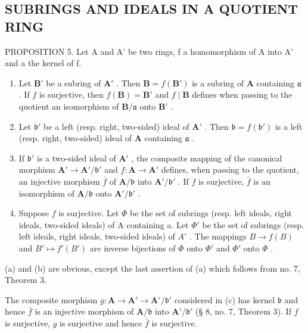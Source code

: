 \subsection{SUBRINGS AND IDEALS IN A QUOTIENT RING}

PROPOSITION 5. Let A and A' be two rings, f a homomorphism of A into A' and a the kernel of f.

\begin{enumerate}
\def\labelenumi{(\alph{enumi})}
\item
  Let \(\mathbf{B}'\) be a subring of \(\mathbf{A}'\) . Then \(\mathbf{B} = f(\mathbf{B}')\) is a subring of \(\mathbf{A}\) containing \(\mathfrak{a}\) . If \(f\) is surjective, then \(f(\mathbf{B}) = \mathbf{B}'\) and \(f \mid \mathbf{B}\) defines when passing to the quotient an isomorphism of \(\mathbf{B}/\mathfrak{a}\) onto \(\mathbf{B}'\) .
\item
  Let \(\mathfrak{b}'\) be a left (resp. right, two-sided) ideal of \(\mathbf{A}'\) . Then \(\mathfrak{b} = f(\mathfrak{b}')\) is a left (resp. right, two-sided) ideal of \(\mathbf{A}\) containing \(\mathfrak{a}\) .
\item
  If \(\mathfrak{b}'\) is a two-sided ideal of \(\mathbf{A}'\) , the composite mapping of the canonical morphism \(\mathbf{A}' \to \mathbf{A}' / \mathfrak{b}'\) and \(f: \mathbf{A} \to \mathbf{A}'\) defines, when passing to the quotient, an injective morphism \(\bar{f}\) of \(\mathbf{A} / \mathfrak{b}\) into \(\mathbf{A}' / \mathfrak{b}'\) . If \(f\) is surjective, \(\bar{f}\) is an isomorphism of \(\mathbf{A} / \mathfrak{b}\) onto \(\mathbf{A}' / \mathfrak{b}'\) .
\item
  Suppose \(f\) is surjective. Let \(\Phi\) be the set of subrings (resp. left ideals, right ideals, two-sided ideals) of A containing a. Let \(\Phi'\) be the set of subrings (resp. left ideals, right ideals, two-sided ideals) of \(A'\) . The mappings \(B \to f(B)\) and \(B' \mapsto f'(B')\) are inverse bijections of \(\Phi\) onto \(\Phi'\) and \(\Phi'\) onto \(\Phi\) .
\end{enumerate}

(a) and (b) are obvious, except the last assertion of (a) which follows from no. 7, Theorem 3.

The composite morphism \(g: \mathbf{A} \to \mathbf{A}' \to \mathbf{A}' / \mathfrak{b}'\) considered in (c) has kernel \(\mathfrak{b}\) and hence \(\bar{f}\) is an injective morphism of \(\mathbf{A} / \mathfrak{b}\) into \(\mathbf{A}' / \mathfrak{b}'\) (§ 8, no. 7, Theorem 3). If \(f\) is surjective, \(g\) is surjective and hence \(\bar{f}\) is surjective.

